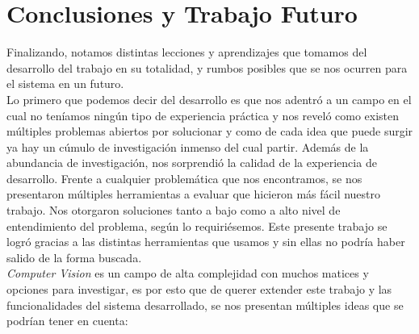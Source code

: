 \documentclass[a4paper]{article}
\begin{document}
\section{Conclusiones y Trabajo Futuro}

Finalizando, notamos distintas lecciones y aprendizajes que tomamos del desarrollo del trabajo en su totalidad, y rumbos posibles que se nos ocurren para el sistema en un futuro. \\

Lo primero que podemos decir del desarrollo es que nos adentró a un campo en el cual no teníamos ningún tipo de experiencia práctica y nos reveló como existen múltiples problemas abiertos por solucionar y como de cada idea que puede surgir ya hay un cúmulo de investigación inmenso del cual partir.
Además de la abundancia de investigación, nos sorprendió la calidad de la experiencia de desarrollo. Frente a cualquier problemática que nos encontramos, se nos presentaron múltiples herramientas a evaluar que hicieron más fácil nuestro trabajo. Nos otorgaron soluciones tanto a bajo como a alto nivel de entendimiento del problema, según lo requiriésemos. Este presente trabajo se logró gracias a las distintas herramientas que usamos y sin ellas no podría haber salido de la forma buscada. \\

\textit{Computer Vision} es un campo de alta complejidad con muchos matices y opciones para investigar, es por esto que de querer extender este trabajo y las funcionalidades del sistema desarrollado, se nos presentan múltiples ideas que se podrían tener en cuenta:
\end{document}
